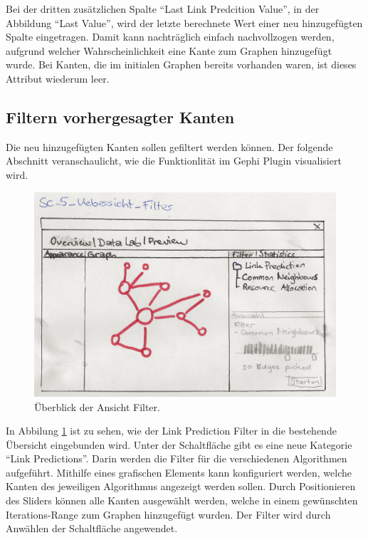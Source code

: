 Bei der dritten zusätzlichen Spalte ``Last Link Predcition Value'', in der Abbildung ``Last Value'', wird der letzte berechnete Wert einer neu hinzugefügten Spalte eingetragen.
Damit kann nachträglich einfach nachvollzogen werden, aufgrund welcher Wahrscheinlichkeit eine Kante zum Graphen hinzugefügt wurde.
Bei Kanten, die im initialen Graphen bereits vorhanden waren, ist dieses Attribut wiederum leer.

\subsection{Filtern vorhergesagter Kanten}

Die neu hinzugefügten Kanten sollen gefiltert werden können.
Der folgende Abschnitt veranschaulicht, wie die Funktionlität im Gephi Plugin visualisiert wird.

\begin{figure}
    \includegraphics[width=\linewidth]{resources/SC-5.png}
    \caption{Überblick der Ansicht Filter.}
    \label{fig:screen5}
\end{figure}

In Abbilung \ref{fig:screen5} ist zu sehen, wie der Link Prediction Filter in die bestehende Übersicht eingebunden wird.
Unter der Schaltfläche  gibt es eine neue Kategorie ``Link Predictions''.
Darin werden die Filter für die verschiedenen Algorithmen aufgeführt.
Mithilfe eines grafischen Elements kann konfiguriert werden, welche Kanten des jeweiligen Algorithmus angezeigt werden sollen.
Durch Positionieren des Sliders können alle Kanten ausgewählt werden, welche in einem gewünschten Iterations-Range zum Graphen hinzugefügt wurden.
Der Filter wird durch Anwählen der Schaltfläche  angewendet.

